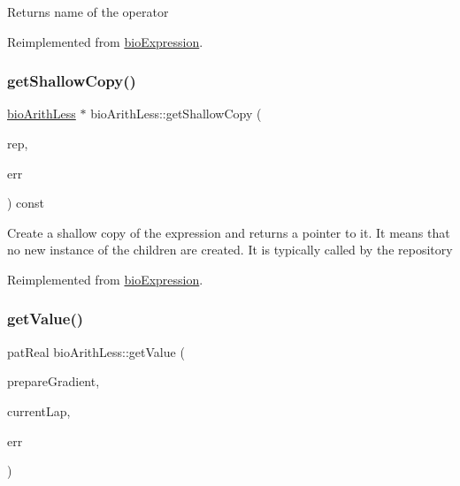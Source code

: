 \begin{DoxyReturn}{Returns}
name of the operator 
\end{DoxyReturn}


Reimplemented from \hyperlink{classbio_expression_a2353a4afb3a2b0af7c63aba086a72bde}{bio\+Expression}.

\mbox{\label{classbio_arith_less_a186b89363273b2972ae1beb00a1efbb0}} 
\subsubsection{\texorpdfstring{get\+Shallow\+Copy()}{getShallowCopy()}}
{\footnotesize\ttfamily \hyperlink{classbio_arith_less}{bio\+Arith\+Less} $\ast$ bio\+Arith\+Less\+::get\+Shallow\+Copy (\begin{DoxyParamCaption}\item[{\hyperlink{classbio_expression_repository}{bio\+Expression\+Repository} $\ast$}]{rep,  }\item[{pat\+Error $\ast$\&}]{err }\end{DoxyParamCaption}) const\hspace{0.3cm}{\ttfamily [virtual]}}

Create a shallow copy of the expression and returns a pointer to it. It means that no new instance of the children are created. It is typically called by the repository 

Reimplemented from \hyperlink{classbio_expression_a442534762693b92baaf33928979a1bf8}{bio\+Expression}.

\mbox{\label{classbio_arith_less_aa53cd0dfe26ec7e75b760661b940ac0d}} 
\subsubsection{\texorpdfstring{get\+Value()}{getValue()}}
{\footnotesize\ttfamily pat\+Real bio\+Arith\+Less\+::get\+Value (\begin{DoxyParamCaption}\item[{pat\+Boolean}]{prepare\+Gradient,  }\item[{pat\+U\+Long}]{current\+Lap,  }\item[{pat\+Error $\ast$\&}]{err }\end{DoxyParamCaption})\hspace{0.3cm}{\ttfamily [virtual]}}

